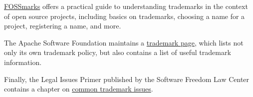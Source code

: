 \begin{kaobox}[frametitle=Trademark resources]

\href{https://fossmarks.org/}{FOSSmarks} offers a practical guide to understanding trademarks in the context of open source projects, including basics on trademarks, choosing a name for a project, registering a name, and more.

The Apache Software Foundation maintains a \href{https://www.apache.org/foundation/marks/resources}{trademark page}, which lists not only its own trademark policy, but also contains a list of useful trademark information.

Finally, the Legal Issues Primer published by the Software Freedom Law Center contains a chapter on \href{https://www.softwarefreedom.org/resources/2008/foss-primer.html#x1-600005}{common trademark issues}.

\end{kaobox}

